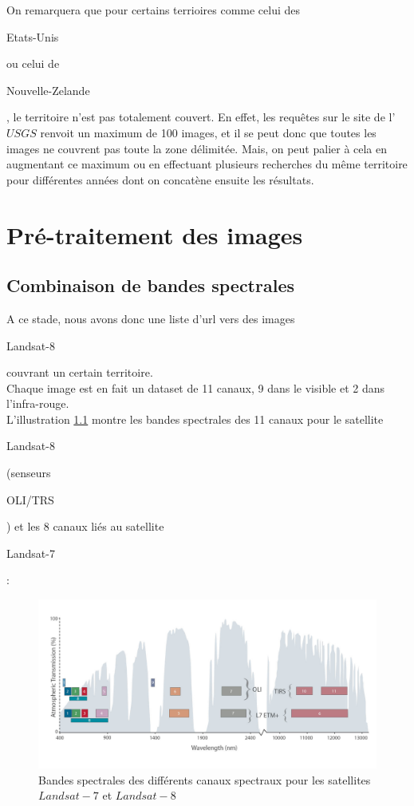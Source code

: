 \documentclass{book}
\begin{document}
\clearpage

On remarquera que pour certains terrioires comme celui des \begin{itshape}Etats-Unis\end{itshape} ou celui de \begin{itshape}Nouvelle-Zelande\end{itshape}, 
le territoire n'est pas totalement couvert. En effet, les requ\^{e}tes sur le site de l'$USGS$ renvoit un maximum 
de 100 images, et il se peut donc que toutes les images ne couvrent pas toute la zone délimitée. 
Mais, on peut palier à cela en augmentant ce maximum 
ou en effectuant plusieurs recherches du même territoire pour différentes années dont on concatène ensuite les résultats.\\

\chapter{Pré-traitement des images}
\section{Combinaison de bandes spectrales}

A ce stade, nous avons donc une liste d'url vers des images \begin{itshape}Landsat-8\end{itshape} couvrant un certain territoire.\\
Chaque image est en fait un dataset de 11 canaux, 9 dans le visible et 2 dans l'infra-rouge.\\
L'illustration \ref{lc8_bands} montre les bandes spectrales des 11 canaux pour le satellite 
\begin{itshape}Landsat-8\end{itshape} (senseurs \begin{itshape}OLI/TRS\end{itshape}) et les 8 canaux liés au satellite \begin{itshape}Landsat-7\end{itshape}:
\begin{figure}[H]
\begin{center}
\includegraphics[scale=0.2]{images/landsat8_bands.jpg}
\end{center}
\caption{Bandes spectrales des différents canaux spectraux pour les satellites $Landsat-7$ et $Landsat-8$ \cite{landsat8}}
\label{lc8_bands}
\end{figure}
\end{document}
